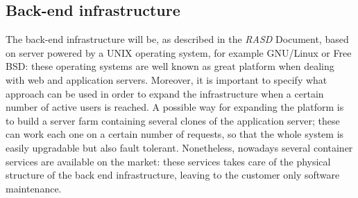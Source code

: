 \subsection{Back-end infrastructure}
The back-end infrastructure will be, as described in the \emph{RASD} Document, based on server powered by a UNIX operating system, for example GNU/Linux or Free BSD: these operating systems are well known as great platform when dealing with web and application servers. Moreover, it is important to specify what approach can be used in order to expand the infrastructure when a certain number of active users is reached. A possible way for expanding the platform is to build a server farm containing several clones of the application server; these can work each one on a certain number of requests, so that the whole system is easily upgradable but also fault tolerant. Nonetheless, nowadays several container services are available on the market: these services takes care of the physical structure of the back end infrastructure, leaving to the customer only software maintenance.   
